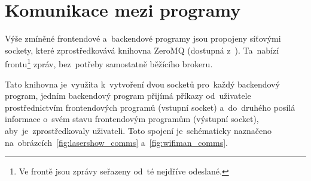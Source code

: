 \section{Komunikace mezi programy}\label{sec:comms}
Výše zmíněné frontendové a~backendové programy jsou propojeny síťovými sockety, které zprostředkovává knihovna ZeroMQ (dostupná z~\cite{zeromq}). Ta~nabízí frontu\footnote{Ve frontě jsou zprávy seřazeny od~té nejdříve odeslané.} zpráv, bez~potřeby samostatně běžícího brokeru.

Tato knihovna je~využita k~vytvoření dvou socketů pro~každý backendový program, jedním backendový program přijímá příkazy od~uživatele prostřednictvím frontendových programů (vstupní socket) a~do~druhého posílá informace o~svém stavu frontendovým programům (výstupní socket), aby~je~zprostředkovaly uživateli. Toto spojení je~schématicky naznačeno na~obrázcích~\ref{fig:lasershow_comms} a~\ref{fig:wifiman_comms}.

